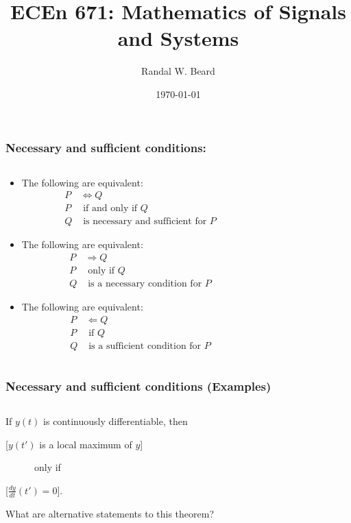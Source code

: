 \documentclass{beamer}
\title{ECEn 671: Mathematics of Signals and Systems}
\author{Randal W. Beard}
\institute{Brigham Young University}
\date{\today}
\begin{document}
\frame{\titlepage}

\begin{frame}
\frametitle{Necessary and sufficient conditions:}	
\begin{columns}
\begin{column}{0.5\textwidth}
   \begin{itemize}
   \item The following are equivalent:
   \begin{align*}
   	P &\iff Q \\
   	P &\text{~if and only if~} Q \\
   	Q &\text{~is necessary and sufficient for~} P
   \end{align*}
    \item The following are equivalent:
   \begin{align*}
   	P &\Rightarrow Q \\
   	P &\text{~only if~} Q \\
   	Q &\text{~is a necessary condition for~} P
   \end{align*}
   \item The following are equivalent:
   \begin{align*}
   	P &\Leftarrow Q \\
   	P &\text{~if~} Q \\
   	Q &\text{~is a sufficient condition for~} P
   \end{align*}
   \end{itemize}
\end{column}
\begin{column}{0.5\textwidth}  
\end{column}
\end{columns}
\end{frame}

\begin{frame}
\frametitle{Necessary and sufficient conditions (Examples)}	
\begin{columns}
\begin{column}{0.5\textwidth}
   \begin{theorem}
   If $y(t)$ is continuously differentiable, then 
   
   [$y(t')$ is a local maximum of $y$] 
   
   ~~~~~~only if 
   
   [$\frac{dy}{dt}(t')=0$].	
   \end{theorem}
   
   \vspace{1cm}
   
   What are alternative statements to this theorem?

\end{column}
\begin{column}{0.5\textwidth}  
\end{column}
\end{columns}
\end{frame}
\end{document}
